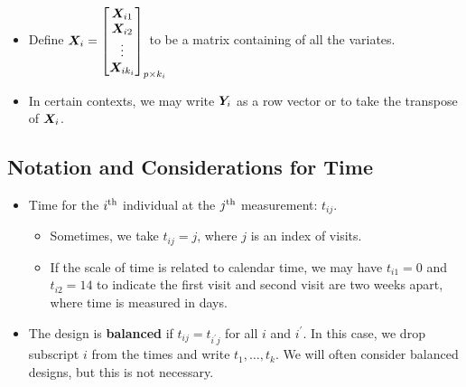 \begin{itemize}
      \item Define
            $\Matrix{X}_i=\begin{bmatrix}
                        \Matrix{X}_{i1} \\
                        \Matrix{X}_{i2} \\
                        \vdots          \\
                        \Matrix{X}_{ik_i}
                  \end{bmatrix}_{\mathrlap{p\times k_i}}$
            to be a matrix containing of all the variates.
      \item In certain contexts, we may write $ \bm{Y}_i $
            as a row vector or to take the transpose of $ \bm{X}_i $.
\end{itemize}
\subsection{Notation and Considerations for Time}
\begin{itemize}
      \item Time for the $ i\textsuperscript{th} $
            individual at the $ j\textsuperscript{th} $ measurement: $ t_{ij} $.
            \begin{itemize}
                  \item Sometimes, we take $ t_{ij}=j $, where $ j $ is an index of visits.
                  \item If the scale of time is related to calendar time,
                        we may have $ t_{i1}=0 $ and $ t_{i2}=14 $ to indicate the first visit and second
                        visit are two weeks apart, where time is measured in days.
            \end{itemize}
      \item The design is \textbf{balanced} if $ t_{ij}=t_{i^\prime j} $
            for all $ i $ and $ i^\prime $. In this case,
            we drop subscript $ i $ from the times and write $ t_1,\ldots,t_k $.
            We will often consider balanced designs, but this is not necessary.
\end{itemize}